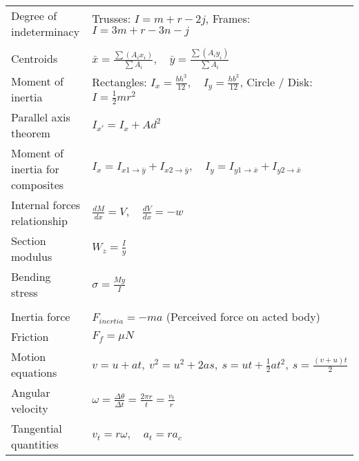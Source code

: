 \begin{tabular}{|l|l|}
    Degree of indeterminacy          & Trusses: $I=m+r-2j$, Frames: $I=3m+r-3n-j$                                                  \\
                                     &                                                                                             \\
    Centroids                        & $\bar{x}=\frac{\sum (A_i x_i)}{\sum A_i},\quad \bar{y}=\frac{\sum (A_i y_i)}{\sum A_i}$     \\
    Moment of inertia                & Rectangles: $I_x=\frac{bh^3}{12},\quad I_y=\frac{hb^3}{12}$, Circle / Disk: $I=\frac12mr^2$ \\
    Parallel axis theorem            & $I_{x'}=I_{x}+Ad^2$                                                                         \\
    Moment of inertia for composites & $I_x=I_{x1\to\bar{y}} + I_{x2\to\bar{y}},\quad I_y=I_{y1\to\bar{x}} + I_{y2\to\bar{x}}$     \\
    Internal forces relationship     & $\frac{dM}{dx}=V,\quad \frac{dV}{dx}=-w$                                                    \\
    Section modulus                  & $W_z=\frac{I}{y}$                                                                           \\
    Bending stress                   & $\sigma=\frac{My}{I}$                                                                       \\
                                     &                                                                                             \\
    Inertia force                    & $F_{inertia}=-ma$  (Perceived force on acted body)                                          \\
    Friction                         & $F_f=\mu N$                                                                                 \\
    Motion equations                 & $v=u+at,\ v^2=u^2+2as,\ s=ut+\frac{1}{2}at^2,\ s=\frac{(v+u)t}{2}$                          \\
    Angular velocity                 & $\omega = \frac{\Delta\theta}{\Delta t}=\frac{2\pi r}{t} = \frac{v_t}{r}$                   \\
    Tangential quantities            & $v_t = r\omega,\quad a_t = r a_c$                                                           \\

\end{tabular}
